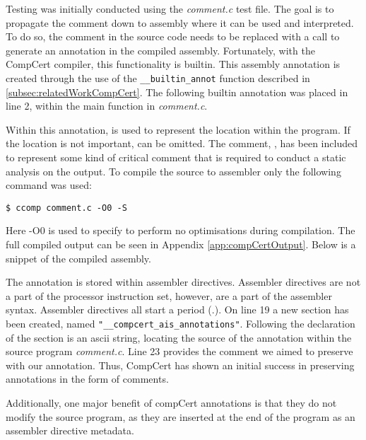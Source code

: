 Testing was initially conducted using the \textit{comment.c} test file. The goal is to propagate the comment down to assembly where it can be used and interpreted. To do so, the comment in the source code needs to be replaced with a call to generate an annotation in the compiled assembly. Fortunately, with the CompCert compiler, this functionality is builtin. This assembly annotation is created through the use of the \texttt{\_\_builtin\_annot} function described in \ref{subsec:relatedWorkCompCert}. The following builtin annotation was placed in line 2, within the main function in \textit{comment.c}.



Within this annotation,  is used to represent the location within the program. If the location is not important,  can be omitted. The comment, , has been included to represent some kind of critical comment that is required to conduct a static analysis on the output. To compile the source to assembler only the following command was used:

\begin{lstlisting}[numbers=none]
$ ccomp comment.c -O0 -S
\end{lstlisting}

Here -O0 is used to specify to perform no optimisations during compilation. The full compiled output can be seen in Appendix \ref{app:compCertOutput}. Below is a snippet of the compiled assembly.



The annotation is stored within assembler directives. Assembler directives are not a part of the processor instruction set, however, are a part of the assembler syntax. Assembler directives all start a period (.). On line 19 a new section has been created, named \texttt{"\_\_compcert\_ais\_annotations"}. Following the declaration of the section is an ascii string, locating the source of the annotation within the source program \textit{comment.c}. Line 23 provides the comment we aimed to preserve with our annotation. Thus, CompCert has shown an initial success in preserving annotations in the form of comments.

Additionally, one major benefit of compCert annotations is that they do not modify the source program, as they are inserted at the end of the program as an assembler directive metadata.

